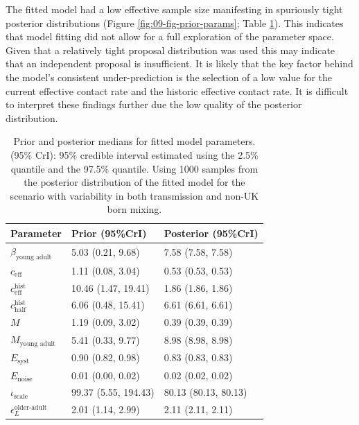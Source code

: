 \documentclass[11pt,twoside]{bristolthesis}
\begin{document}
  The fitted model had a low effective sample size manifesting in spuriously tight posterior distributions (Figure \ref{fig:09-fig-prior-params}; Table \ref{tab:09-prior-posterior}). This indicates that model fitting did not allow for a full exploration of the parameter space. Given that a relatively tight proposal distribution was used this may indicate that an independent proposal is insufficient. It is likely that the key factor behind the model's consistent under-prediction is the selection of a low value for the current effective contact rate and the historic effective contact rate. It is difficult to interpret these findings further due the low quality of the posterior distribution.
  \begin{longtable}{lll}
  \caption[Prior and posterior medians for fitted model parameters]{\label{tab:09-prior-posterior}Prior and posterior medians for fitted model parameters. (95\% CrI): 95\% credible interval estimated using the 2.5\% quantile and the 97.5\% quantile. Using 1000 samples from the posterior distribution of the fitted model for the scenario with variability in both transmission and non-UK born mixing.}\\
  \toprule
  Parameter & Prior (95\%CrI) & Posterior (95\%CrI)\\
  \midrule
  $\beta_{\text{young adult}}$ & 5.03 (0.21, 9.68) & 7.58 (7.58, 7.58)\\
  $c_{\text{eff}}$ & 1.11 (0.08, 3.04) & 0.53 (0.53, 0.53)\\
  $c^{\text{hist}}_{\text{eff}}$ & 10.46 (1.47, 19.41) & 1.86 (1.86, 1.86)\\
  $c^{\text{hist}}_{\text{half}}$ & 6.06 (0.48, 15.41) & 6.61 (6.61, 6.61)\\
  $M$ & 1.19 (0.09, 3.02) & 0.39 (0.39, 0.39)\\
  \addlinespace
  $M_{\text{young adult}}$ & 5.41 (0.33, 9.77) & 8.98 (8.98, 8.98)\\
  $E_{\text{syst}}$ & 0.90 (0.82, 0.98) & 0.83 (0.83, 0.83)\\
  $E_{\text{noise}}$ & 0.01 (0.00, 0.02) & 0.02 (0.02, 0.02)\\
  $\iota_{\text{scale}}$ & 99.37 (5.55, 194.43) & 80.13 (80.13, 80.13)\\
  $\epsilon^{\text{older-adult}}_L$ & 2.01 (1.14, 2.99) & 2.11 (2.11, 2.11)\\
  \bottomrule
  \end{longtable}
\end{document}
